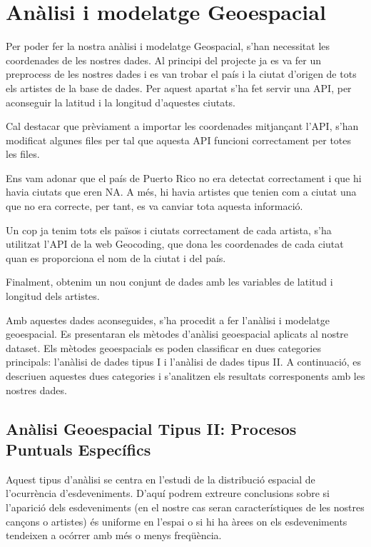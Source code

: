 \section{Anàlisi i modelatge Geoespacial}


Per poder fer la nostra anàlisi i modelatge Geospacial, s'han necessitat les coordenades de les nostres dades. Al principi del projecte ja es va fer un preprocess de les nostres dades i es van trobar el país i la ciutat d'origen de tots els artistes de la base de dades. Per aquest apartat s'ha fet servir una API, per aconseguir la latitud i la longitud d'aquestes ciutats.

Cal destacar que prèviament a importar les coordenades mitjançant l'API, s'han modificat algunes files per tal que aquesta API funcioni correctament per totes les files.

Ens vam adonar que el país de Puerto Rico no era detectat correctament i que hi havia ciutats que eren NA. A més, hi havia artistes que tenien com a ciutat una que no era correcte, per tant, es va canviar tota aquesta informació.

Un cop ja tenim tots els països i ciutats correctament de cada artista, s'ha utilitzat l'API de la web Geocoding, que dona les coordenades de cada ciutat quan es proporciona el nom de la ciutat i del país.

Finalment, obtenim un nou conjunt de dades amb les variables de latitud i longitud dels artistes.

Amb aquestes dades aconseguides, s'ha procedit a fer l'anàlisi i modelatge geoespacial. Es presentaran els mètodes d'anàlisi geoespacial aplicats al nostre dataset. Els mètodes geoespacials es poden classificar en dues categories principals: l'anàlisi de dades tipus I i l'anàlisi de dades tipus II. A continuació, es descriuen aquestes dues categories i s'analitzen els resultats corresponents amb les nostres dades.

\subsection{Anàlisi Geoespacial Tipus II: Procesos Puntuals Específics}

Aquest tipus d'anàlisi se centra en l'estudi de la distribució espacial de l'ocurrència d'esdeveniments. D'aquí podrem extreure conclusions sobre si l'aparició dels esdeveniments (en el nostre cas seran característiques de les nostres cançons o artistes) és uniforme en l'espai o si hi ha àrees on els esdeveniments tendeixen a ocórrer amb més o menys freqüència. \\

